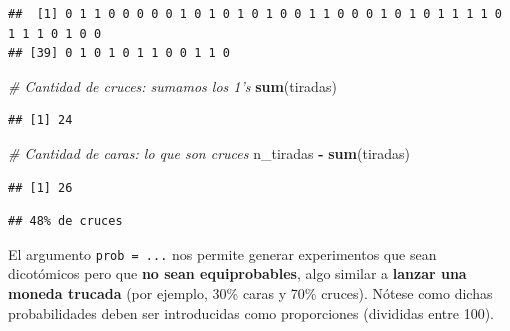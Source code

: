\documentclass[11pt,]{book}
\newenvironment{Shaded}{\begin{snugshade}}{\end{snugshade}}
\newcommand{\CommentTok}[1]{\textcolor[rgb]{0.37,0.37,0.37}{\textit{#1}}}
\newcommand{\DataTypeTok}[1]{\textcolor[rgb]{0.27,0.27,0.27}{#1}}
\newcommand{\DecValTok}[1]{\textcolor[rgb]{0.06,0.06,0.06}{#1}}
\newcommand{\FloatTok}[1]{\textcolor[rgb]{0.06,0.06,0.06}{#1}}
\newcommand{\KeywordTok}[1]{\textcolor[rgb]{0.27,0.27,0.27}{\textbf{#1}}}
\newcommand{\NormalTok}[1]{#1}
\newcommand{\OperatorTok}[1]{\textcolor[rgb]{0.43,0.43,0.43}{\textbf{#1}}}
\newcommand{\OtherTok}[1]{\textcolor[rgb]{0.37,0.37,0.37}{#1}}
\newcommand{\StringTok}[1]{\textcolor[rgb]{0.5,0.5,0.5}{#1}}
\begin{document}
\begin{verbatim}
##  [1] 0 1 1 0 0 0 0 0 1 0 1 0 1 0 1 0 0 1 1 0 0 0 1 0 1 0 1 1 1 1 0 1 1 1 0 1 0 0
## [39] 0 1 0 1 0 1 1 0 0 1 1 0
\end{verbatim}

\begin{Shaded}
\begin{Highlighting}[]
\CommentTok{# Cantidad de cruces: sumamos los 1's}
\KeywordTok{sum}\NormalTok{(tiradas)}
\end{Highlighting}
\end{Shaded}

\begin{verbatim}
## [1] 24
\end{verbatim}

\begin{Shaded}
\begin{Highlighting}[]
\CommentTok{# Cantidad de caras: lo que son cruces}
\NormalTok{n_tiradas }\OperatorTok{-}\StringTok{ }\KeywordTok{sum}\NormalTok{(tiradas)}
\end{Highlighting}
\end{Shaded}

\begin{verbatim}
## [1] 26
\end{verbatim}

\begin{Shaded}
\end{Shaded}

\begin{verbatim}
## 48% de cruces
\end{verbatim}

El argumento \texttt{prob\ =\ ...} nos permite generar experimentos que sean dicotómicos pero que \textbf{no sean equiprobables}, algo similar a \textbf{lanzar una moneda trucada} (por ejemplo, 30\% caras y 70\% cruces). Nótese como dichas probabilidades deben ser introducidas como proporciones (divididas entre 100).

\begin{Shaded}
\end{Shaded}
\end{document}
